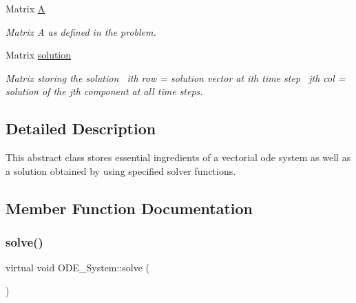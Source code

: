 \begin{DoxyCompactItemize}
\mbox{\label{class_o_d_e___system_a632009677e80b62a1996e842398bf8b6}} 
Matrix \mbox{\hyperlink{class_o_d_e___system_a632009677e80b62a1996e842398bf8b6}{A}}
\begin{DoxyCompactList}\small\item\em Matrix A as defined in the problem. \end{DoxyCompactList}\item 
\mbox{\label{class_o_d_e___system_ab2504680346a353e353f147f1ad9c51d}} 
Matrix \mbox{\hyperlink{class_o_d_e___system_ab2504680346a353e353f147f1ad9c51d}{solution}}
\begin{DoxyCompactList}\small\item\em Matrix storing the solution~\newline
ith row = solution vector at ith time step~\newline
jth col = solution of the jth component at all time steps. \end{DoxyCompactList}\end{DoxyCompactItemize}


\subsection{Detailed Description}
This abstract class stores essential ingredients of a vectorial ode system as well as a solution obtained by using specified solver functions. 

\subsection{Member Function Documentation}
\mbox{\label{class_o_d_e___system_a78a058382148b745fa458f0b9f52f47c}} 
\subsubsection{\texorpdfstring{solve()}{solve()}}
{\footnotesize\ttfamily virtual void O\+D\+E\+\_\+\+System\+::solve (\begin{DoxyParamCaption}{ }\end{DoxyParamCaption})\hspace{0.3cm}{\ttfamily [pure virtual]}}



